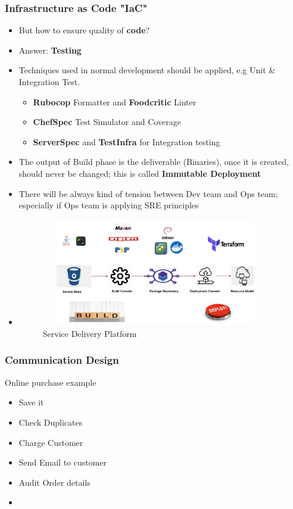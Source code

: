 \documentclass{beamer}
\begin{document}
	\begin{frame}
		\frametitle{Infrastructure as Code \textbf{"IaC"}}
		\begin{itemize}
			\item<1-> \scriptsize{\alert{But how to ensure quality of \textbf{code}?}}
			\item<2-> \scriptsize{Answer: \textbf{Testing}}
			\item<3-> \scriptsize{Techniques used in normal development should be applied, e.g Unit \& Integration Test}. 
				\begin{itemize} 
					\item \scriptsize{\textbf{Rubocop} Formatter and \textbf{Foodcritic} Linter}
					\item \scriptsize{\textbf{ChefSpec} Test Simulator and Coverage}
					\item \scriptsize{\textbf{ServerSpec} and \textbf{TestInfra} for Integration testing}
				\end{itemize}
			\item<4-> \scriptsize{The output of Build phase is the deliverable (Binaries), once it is created, should never be changed; this is called \textbf{Immutable Deployment}}
			\item<5-> \scriptsize{There will be always kind of tension between Dev team and Ops team; especially if Ops team is applying SRE principles}
			\item<1->[]
			\begin{figure}[h]
				\includegraphics[width=100mm,height= 47mm, scale=1]{img/service-delivery-platform.png}
				\caption{Service Delivery Platform}
			\end{figure}
		\end{itemize}
	\end{frame}
	
	\againframe{cd}
	
	
	\begin{frame}
		\frametitle{Communication Design}
		Online purchase example
		\begin{itemize}
			\item<2-> \scriptsize{Save it}
			\item<3-> \scriptsize{Check Duplicates} 
			\item<4-> \scriptsize{Charge Customer}
			\item<5-> \scriptsize{Send Email to customer}
			\item<6-> \scriptsize{Audit Order details }
			
			
			\item<2->[] 
			
		\end{itemize}
	\vspace{100mm}
	\end{frame}
\end{document}
